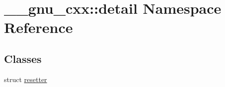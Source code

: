 \hypertarget{namespace____gnu__cxx_1_1detail}{}\section{\+\_\+\+\_\+gnu\+\_\+cxx\+:\+:detail Namespace Reference}
\label{namespace____gnu__cxx_1_1detail}
\subsection*{Classes}
\begin{DoxyCompactItemize}
\item 
struct \hyperlink{struct____gnu__cxx_1_1detail_1_1resetter}{resetter}
\end{DoxyCompactItemize}
